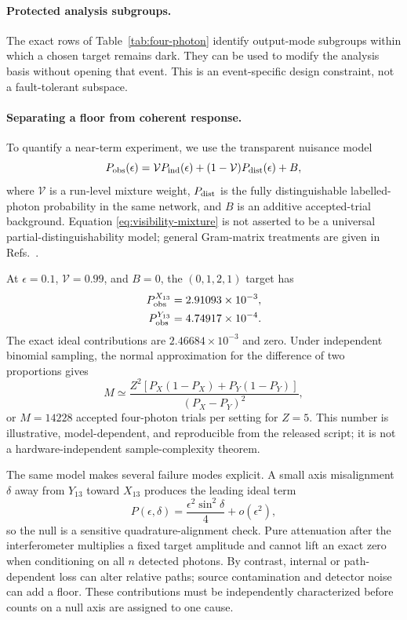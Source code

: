 \documentclass[aps,pra,reprint,amsmath,amssymb,superscriptaddress,longbibliography]{revtex4-2}
\begin{document}
\paragraph*{Protected analysis subgroups.}
The exact rows of Table~\ref{tab:four-photon} identify output-mode subgroups
within which a chosen target remains dark.  They can be used to modify the
analysis basis without opening that event.  This is an event-specific design
constraint, not a fault-tolerant subspace.

\paragraph*{Separating a floor from coherent response.}
To quantify a near-term experiment, we use the transparent nuisance model
\begin{equation}
P_{\rm obs}(\epsilon)=
\mathcal V P_{\rm ind}(\epsilon)
+(1-\mathcal V)P_{\rm dist}(\epsilon)+B ,
\label{eq:visibility-mixture}
\end{equation}
where $\mathcal V$ is a run-level mixture weight, $P_{\rm dist}$ is the
fully distinguishable labelled-photon probability in the same network, and
$B$ is an additive accepted-trial background.  Equation
\eqref{eq:visibility-mixture} is not asserted to be a universal
partial-distinguishability model; general Gram-matrix treatments are given
in Refs.~\cite{Shchesnovich2015,DufourBuchleitner2026}.

At $\epsilon=0.1$, $\mathcal V=0.99$, and $B=0$, the
$(0,1,2,1)$ target has
\begin{align}
P_{\rm obs}^{X_{13}}&=2.91093\times10^{-3},\nonumber\\
P_{\rm obs}^{Y_{13}}&=4.74917\times10^{-4}.
\end{align}
The exact ideal contributions are $2.46684\times10^{-3}$ and zero.
Under independent binomial sampling, the normal approximation for the
difference of two proportions gives
\begin{equation}
M\simeq
\frac{Z^2[P_X(1-P_X)+P_Y(1-P_Y)]}{(P_X-P_Y)^2},
\label{eq:shot-count}
\end{equation}
or $M=14228$ accepted four-photon trials per setting for $Z=5$.
This number is illustrative, model-dependent, and reproducible from the
released script; it is not a hardware-independent sample-complexity theorem.

The same model makes several failure modes explicit.  A small axis
misalignment $\delta$ away from $Y_{13}$ toward $X_{13}$ produces the
leading ideal term
\begin{equation}
P(\epsilon,\delta)=\frac{\epsilon^2\sin^2\delta}{4}
+o(\epsilon^2),
\end{equation}
so the null is a sensitive quadrature-alignment check.  Pure attenuation
after the interferometer multiplies a fixed target amplitude and cannot lift
an exact zero when conditioning on all $n$ detected photons.  By contrast,
internal or path-dependent loss can alter relative paths; source
contamination and detector noise can add a floor.  These contributions must
be independently characterized before counts on a null axis are assigned to
one cause.
\end{document}
